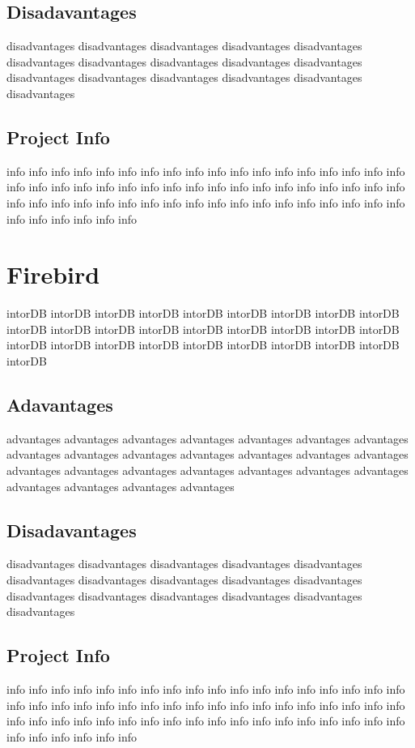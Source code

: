 			\subsection{Disadavantages}
			disadvantages disadvantages disadvantages disadvantages 
			disadvantages disadvantages disadvantages disadvantages 
			disadvantages disadvantages disadvantages disadvantages 
			disadvantages disadvantages disadvantages disadvantages 
			
			\subsection{Project Info}
			info info info info info info info info info info info info 
			info info info info info info info info info info info info 
			info info info info info info info info info info info info 
			info info info info info info info info info info info info 
			info info info info info info info info info info info info
		
		\section{Firebird}
		intorDB intorDB intorDB intorDB intorDB intorDB intorDB 
		intorDB intorDB intorDB intorDB intorDB intorDB intorDB 
		intorDB intorDB intorDB intorDB intorDB intorDB intorDB 
		intorDB intorDB intorDB intorDB intorDB intorDB intorDB 
		
			\subsection{Adavantages}
			advantages advantages advantages advantages advantages 
			advantages advantages advantages advantages advantages 
			advantages advantages advantages advantages advantages 
			advantages advantages advantages advantages advantages 
			advantages advantages advantages advantages advantages 
			
			\subsection{Disadavantages}
			disadvantages disadvantages disadvantages disadvantages 
			disadvantages disadvantages disadvantages disadvantages 
			disadvantages disadvantages disadvantages disadvantages 
			disadvantages disadvantages disadvantages disadvantages 
			
			\subsection{Project Info}
			info info info info info info info info info info info info 
			info info info info info info info info info info info info 
			info info info info info info info info info info info info 
			info info info info info info info info info info info info 
			info info info info info info info info info info info info
				
